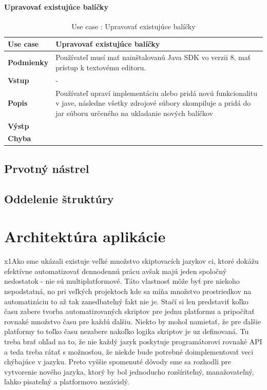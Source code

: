 \paragraph{Upravovať existujúce balíčky}
\begin{center}
	\begin{table}[htbp]
		\begin{tabular}{|p{2.5cm}|p{14cm}|}
			\hline
			\textbf{Use case} & Upravovať existujúce balíčky \\ 
			\hline
			\textbf{Podmienky} &  Používateľ musí mať nainštalovanú Java SDK vo verzii 8, mať prístup k textovému editoru.  \\ 
			\hline
			\textbf{Vstup} & -\\
			\hline
			\textbf{Popis} & Používateľ upraví implementáciu alebo pridá novú funkcionalitu v jave, následne všetky zdrojové súbory skompiluje a pridá do jar súboru určeného na ukladanie nových balíčkov\\ 
			\hline
			\textbf{Výstp} & \\
			\hline
			\textbf{Chyba} & \\
			\hline
		\end{tabular}
		\label{table:1}
		\caption{Use case : Upravovať existujúce balíčky}
	\end{table}
\end{center}

\subsection{Prvotný nástrel}
\subsection{Oddelenie štruktúry}

\section{Architektúra aplikácie}
x1\indent Ako sme ukázali existuje veľké množstvo skiptovacích jazykov ci, ktoré dokážu efektívne automatizovať dennodennú prácu avšak majú jeden spoločný nedostatok - nie sú multiplatformové. Táto vlastnosť môže byť  pre niekoho nepodstatná, no pri veľkých projektoch kde sa míňa množstvo prostriedkov na automatizáciu to až tak zanedbateľný fakt nie je. Stačí si len predstaviť koľko času zabere tvorba automatizovaných skriptov pre jednu platformu a pripočítať rovnaké množstvo času pre každú ďalšiu. Niekto by mohol namietať, že pre ďalšie platformy to toľko času nezabere nakoľko logika skriptov je uz definovaná. Tu treba brať ohľad na to, že nie každý jazyk poskytuje programátorovi rovnaké API a teda treba rátať s možnosťou, že niekde bude potrebné doimplementovať veci chýbajúce v jazyku. Preto vyššie spomenuté dôvody sme sa rozhodli pre vytvorenie nového jazyka, ktorý by bol jednoducho rozšíriteľný, manažovateľný, ľahko pisateľný a platformovo nezávislý. \cite{morf}

